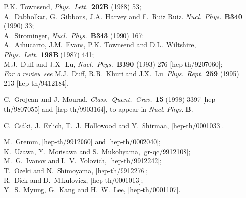 \documentclass[a4paper,12pt]{article}
\begin{document}
\begin{thebibliography}{99}
P.K.~Townsend,
{\it Phys.\ Lett.}\ {\bf 202B} (1988)  53; \\
%
A.~Dabholkar, G.~Gibbons, J.A.~Harvey and F.~Ruiz Ruiz,
{\it Nucl.\ Phys.}\ {\bf B340} (1990) 33; \\
%
A.~Strominger,
{\it Nucl.\ Phys.}\ {\bf B343} (1990) 167;\\
%
A.~Achucarro, J.M.~Evans, P.K.~Townsend and D.L.~Wiltshire,
{\it Phys.\ Lett.}\ {\bf 198B} (1987) 441; \\
%
M.J.~Duff and J.X.~Lu,
{\it Nucl.\ Phys.}\ {\bf B390} (1993) 276
[hep-th/9207060];\\
%
{\it For a review see}
M.J.~Duff, R.R.~Khuri and J.X.~Lu,
{\it Phys.\ Rept.}\ {\bf 259} (1995) 213
[hep-th/9412184].

C.~Grojean and J.~Mourad,
{\it Class.\ Quant.\ Grav.}\  {\bf 15} (1998) 3397
[hep-th/9807055]
%
and
[hep-th/9903164], to appear in {\it Nucl. Phys.} {\bf B}.


C.~Cs\'aki, J.~Erlich, T.~J.~Hollowood and Y.~Shirman,
[hep-th/0001033].


M.~Gremm,
[hep-th/9912060]
and
[hep-th/0002040];\\
%
K.~Uzawa, Y.~Morisawa and S.~Mukohyama,
[gr-qc/9912108];\\
%
M.~G.~Ivanov and I.~V.~Volovich,
[hep-th/9912242];\\
%
T.~Ozeki and N.~Shimoyama,
[hep-th/9912276];\\
%
R.~Dick and D.~Mikulovicz,
[hep-th/0001013];\\
%
Y.~S.~Myung, G.~Kang and H.~W.~Lee,
[hep-th/0001107].



\end{thebibliography}
\end{document}
